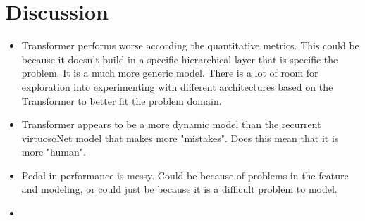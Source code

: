 \chapter{Discussion} \label{ch:ch5}
\begin{itemize}
    \item Transformer performs worse according the quantitative metrics. This could be because it doesn't build in a specific hierarchical layer that is specific the problem. It is a much more generic model. There is a lot of room for exploration into experimenting with different architectures based on the Transformer to better fit the problem domain. 
    \item Transformer appears to be a more dynamic model than the recurrent virtuosoNet model that makes more "mistakes". Does this mean that it is more "human". 
    \item Pedal in performance is messy. Could be because of problems in the feature and modeling, or could just be because it is a difficult problem to model. 
    \item {}
\end{itemize}